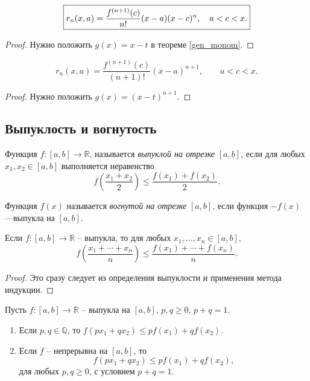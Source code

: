 \begin{corollary}
    \[
     \begin{boxed}{
         r_n(x,a) = \frac{f^{(n+1)}(c)}{n!}(x-a)(x-c)^n, \quad a < c <x.}
     \end{boxed}
    \]
\end{corollary}
\begin{proof}
    Нужно положить $g(x) = x-t$ в теореме \ref{gen_monom}.
\end{proof}

\begin{corollary}\label{monom_in_Langrange}
    \[
     \boxed{
      r_n(x,a) = \frac{f^{(n+1)}(c)}{(n+1)!}(x-a)^{n+1}, \qquad a < c <x.
     }
    \]
\end{corollary}
\begin{proof}
    Нужно положить $g(x) = (x-t)^{n+1}.$
\end{proof}


\subsection{Выпуклость и вогнутость}

\begin{definition}
 Функция $f:[a,b] \to \mathbb{R}$, называется \textit{выпуклой на отрезке} $[a,b]$, если для любых $x_1,x_2 \in [a,b]$ выполняется неравенство
 \[
  f \left( \frac{x_1+x_2}{2} \right) \le \frac{f(x_1) + f(x_2)}{2}.
 \]

 Функция $f(x)$ называется \textit{вогнутой на отрезке} $[a,b]$, если функция $-f(x)$ ---выпукла на $[a,b].$
\end{definition}

\begin{lemma}\label{convex_for_n}
 Если $f:[a,b] \to \mathbb{R}$ -- выпукла, то для любых $x_1,\ldots, x_n \in [a,b]$,
 \[
  f \left( \frac{x_1+ \cdots + x_n}{n} \right) \le \frac{f(x_1) + \cdots + f(x_n)}{n}.
 \]
\end{lemma}
\begin{proof}
 Это сразу следует из определения выпуклости и применения метода индукции. 
\end{proof}

\begin{proposition}\label{convex_proposition}
    Пусть $f:[a,b] \to \mathbb{R}$ -- выпукла на $[a,b]$, $p,q \ge 0$, $p+q=1$.
    \begin{enumerate}
        \item Если $p,q\in \mathbb{Q}$, то $f(px_1 + qx_2) \le p f(x_1) + q f(x_2)$.
        \item Если $f$ -- непрерывна на $[a,b]$, то 
        \[
         f(px_1 + qx_2) \le p f(x_1) + q f(x_2),
        \]
 для любых $p,q \ge 0$, с условием $p+q=1$.
    \end{enumerate}
\end{proposition}

